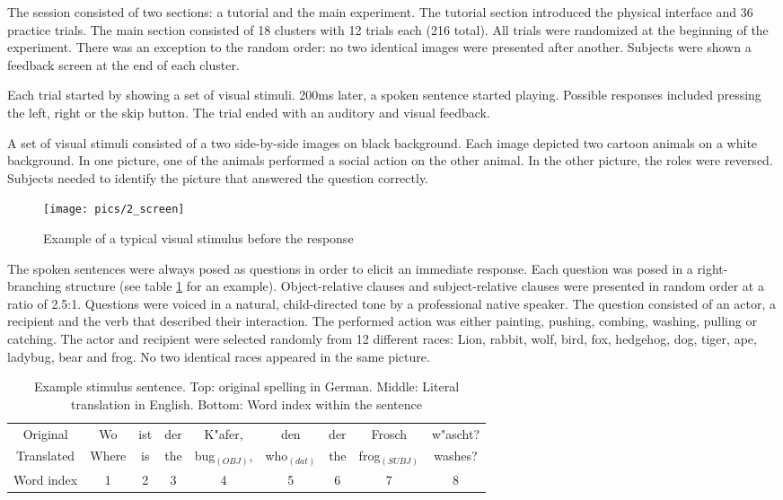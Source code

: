 The session consisted of two sections: a tutorial and the main experiment.
The tutorial section introduced the physical interface and 36 practice trials.
The main section consisted of 18 clusters with 12 trials each (216 total).
All trials were randomized at the beginning of the experiment.
There was an exception to the random order: no two identical images were presented after another.
Subjects were shown a feedback screen at the end of each cluster.

Each trial started by showing a set of visual stimuli.
200ms later, a spoken sentence started playing.
Possible responses included pressing the left, right or the skip button.
The trial ended with an auditory and visual feedback.

A set of visual stimuli consisted of a two side-by-side images on black background.
Each image depicted two cartoon animals on a white background.
In one picture, one of the animals performed a social action on the other animal.
In the other picture, the roles were reversed.
Subjects needed to identify the picture that answered the question correctly.

\begin{figure}[h]
\begin{center}
\vspace*{5mm}
\texttt{[image: pics/2\_screen]}
\caption{\label{2.screen} Example of a typical visual stimulus before the response}
\end{center}
\end{figure}

The spoken sentences were always posed as questions in order to elicit an immediate response.
Each question was posed in a right-branching structure (see table \ref{2.sentences} for an example).
Object-relative clauses and subject-relative clauses were presented in random order at a ratio of 2.5:1.
Questions were voiced in a natural, child-directed tone by a professional native speaker.
The question consisted of an actor, a recipient and the verb that described their interaction.
The performed action was either painting, pushing, combing, washing, pulling or catching.
The actor and recipient were selected randomly from 12 different races: Lion, rabbit, wolf, bird, fox, hedgehog, dog, tiger, ape, ladybug, bear and frog.
No two identical races appeared in the same picture.

\vspace{5mm}
\begin{table}[htb]
\begin{center}
\begin{tabular}{ccccccccc}
Original & Wo & ist & der & K"afer, & den & der & Frosch & w"ascht?\\
Translated & Where & is & the & bug$_{(OBJ)}$, & who$_{(dat)}$ & the & frog$_{(SUBJ)}$ & washes?\\
Word index & 1 & 2 & 3 & 4 & 5 & 6 & 7 & 8
\end{tabular}
\caption{\label{2.sentences} Example stimulus sentence. Top: original spelling in German. Middle: Literal translation in English. Bottom: Word index within the sentence}
\end{center}
\end{table}
\vspace{5mm}

